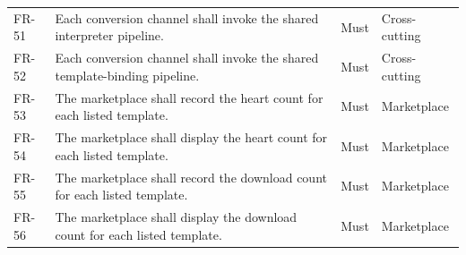 \begin{xltabular}{\textwidth}{@{}p{0.12\textwidth}X p{0.15\textwidth}p{0.20\textwidth}@{}}
FR-51 & Each conversion channel shall invoke the shared interpreter pipeline. & Must & Cross-cutting \\
FR-52 & Each conversion channel shall invoke the shared template-binding pipeline. & Must & Cross-cutting \\
FR-53 & The marketplace shall record the heart count for each listed template. & Must & Marketplace \\
FR-54 & The marketplace shall display the heart count for each listed template. & Must & Marketplace \\
FR-55 & The marketplace shall record the download count for each listed template. & Must & Marketplace \\
FR-56 & The marketplace shall display the download count for each listed template. & Must & Marketplace \\
\end{xltabular}


